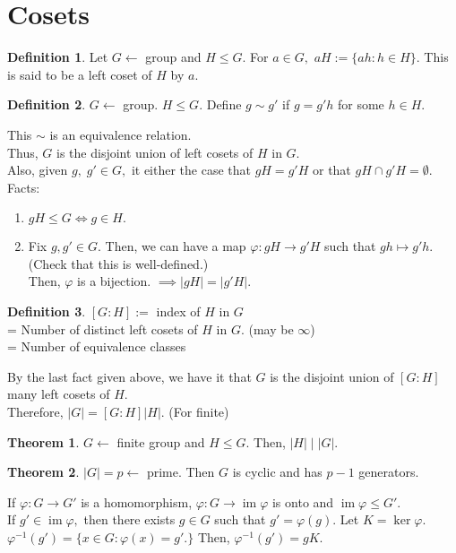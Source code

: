 \documentclass[12 pt, a4paper, toc=graduated, oneside]{article}
\theoremstyle{definition}
\newtheorem{defn}{Definition}
\newtheorem{theorem}{Theorem}
\newcommand{\im}{\operatorname{im}}
\begin{document}
\section{Cosets}
\begin{defn}
	Let $G \longleftarrow$ group and $H \le G.$ For $a \in G,$ $aH := \{ah : h \in H\}.$ This is said to be a left coset of $H$ by $a.$
\end{defn}
\begin{defn}
	$G \longleftarrow$ group. $H \le G.$ Define $g \sim g'$ if $g = g'h$ for some $h \in H.$
\end{defn}
This $\sim$ is an equivalence relation.\\
Thus, $G$ is the disjoint union of left cosets of $H$ in $G.$\\
Also, given $g,\; g'\in G,$ it either the case that $gH = g'H$ or that $gH \cap g'H = \emptyset.$\\
Facts:
\begin{enumerate}[nosep] 
	\item $gH \le G \iff g \in H.$
	\item Fix $g, g' \in G.$ Then, we can have a map $\varphi:gH \to g'H$ such that $gh \mapsto g'h.$ (Check that this is well-defined.)\\
	Then, $\varphi$ is a bijection. $\implies |gH| = |g'H|.$
\end{enumerate}
\begin{defn}
	$[G:H] := $ index of $H$ in $G$\\
	= Number of distinct left cosets of $H$ in $G.$ \hfill (may be $\infty$)\\
	= Number of equivalence classes
\end{defn}
By the last fact given above, we have it that $G$ is the disjoint union of $[G:H]$ many left cosets of $H.$\\
Therefore, $|G| = [G:H] |H|.$ \hfill (For finite)
\begin{theorem}
	$G \longleftarrow$ finite group and $H \le G.$ Then, $|H| \mid |G|.$
\end{theorem}
\begin{theorem}
	$|G| = p \longleftarrow$ prime. Then $G$ is cyclic and has $p-1$ generators.
\end{theorem}
If $\varphi:G \to G'$ is a homomorphism, $\varphi:G \to \im \varphi$ is onto and $\im \varphi \le G'.$\\
If $g' \in \im \varphi,$ then there exists $g \in G$ such that $g' = \varphi(g).$ Let $K = \ker \varphi.$\\
$\varphi^{-1}(g') = \{x \in G : \varphi(x) = g'.\}$ Then, $\varphi^{-1}(g') = gK.$\\
\end{document}

